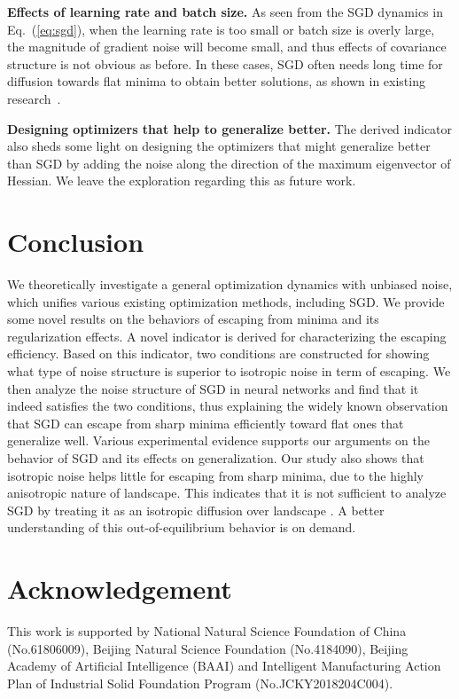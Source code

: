 \documentclass{article}
\begin{document}
\textbf{Effects of learning rate and batch size.}
As seen from the SGD dynamics in Eq.~(\ref{eq:sgd}), when the learning rate is too small or batch size is overly large, the magnitude of gradient noise will become small, and thus effects of covariance structure is not obvious as before. In these cases, SGD often needs long time for diffusion towards flat minima to obtain better solutions, as shown in existing research~\citep{keskar2016large,hoffer2017,jastrzkebski2017three}.

\textbf{Designing optimizers that help to generalize better.}
The derived indicator also sheds some light on designing the optimizers that might generalize better than SGD by adding the noise along the direction of the maximum eigenvector of Hessian. We leave the exploration regarding  this as future work.

\section{Conclusion}
\label{sec:con}

We theoretically investigate a general optimization dynamics with unbiased noise, which unifies various existing optimization methods, including SGD.
We provide some novel results on the behaviors of escaping from minima and its regularization effects.
A novel indicator is derived for characterizing the escaping efficiency.
Based on this indicator, two conditions are constructed for showing what type of noise structure is superior to isotropic noise in term of escaping.
We then analyze the noise structure of SGD in neural networks and find that it indeed satisfies the two conditions, thus explaining the widely known observation that SGD can escape from sharp minima efficiently toward flat ones that generalize well.
Various experimental evidence supports our arguments on the behavior of SGD and its effects on generalization. 
Our study also shows that isotropic noise helps little for escaping from sharp minima, due to the highly anisotropic nature of landscape.
This indicates that it is not sufficient to analyze SGD by treating it as an isotropic diffusion over landscape \citep{zhang2017hitting,mou2017generalization}.
A better understanding of this out-of-equilibrium behavior \citep{chaudhari2017stochastic} is on demand. 
\section*{Acknowledgement}
This  work  is  supported  by  National  Natural  Science  Foundation  of  China  (No.61806009),  Beijing Natural  Science  Foundation  (No.4184090), Beijing Academy of Artificial Intelligence (BAAI) and Intelligent  Manufacturing  Action  Plan  of  Industrial  Solid Foundation  Program  (No.JCKY2018204C004).
\end{document}
